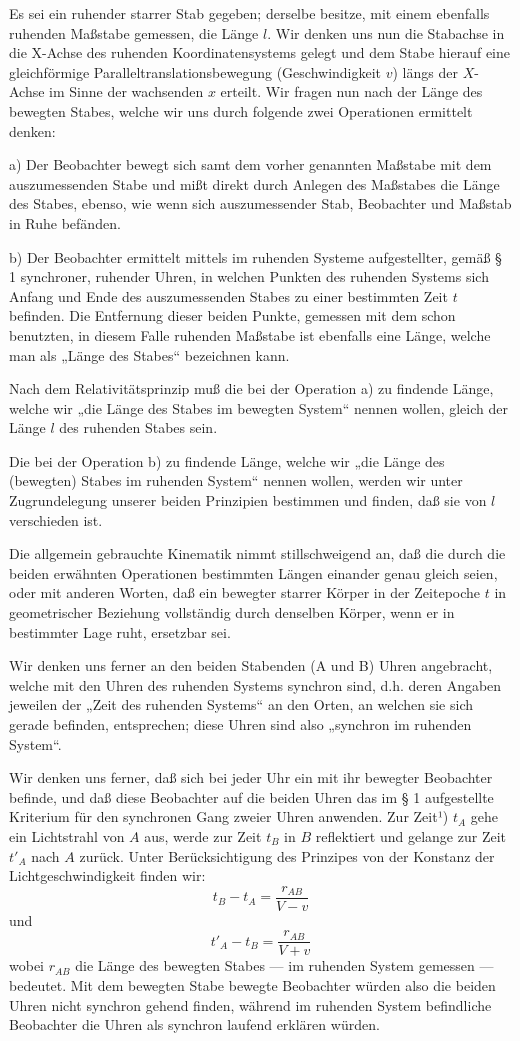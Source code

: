 \documentclass[17pt]{webarticle}       %
\begin{document}
Es sei ein ruhender starrer Stab gegeben; derselbe besitze, mit einem ebenfalls ruhenden Maßstabe gemessen, die Länge $l$. Wir denken uns nun die Stabachse in die X-Achse des ruhenden Koordinatensystems gelegt und dem Stabe hierauf eine gleichförmige Paralleltranslationsbewegung (Geschwindigkeit $v$) längs der $X$-Achse im Sinne der wachsenden $x$ erteilt. Wir fragen nun nach der Länge des bewegten Stabes, welche wir uns durch folgende zwei Operationen ermittelt denken:

a) Der Beobachter bewegt sich samt dem vorher genannten Maßstabe mit dem auszumessenden Stabe und mißt direkt durch Anlegen des Maßstabes die Länge des Stabes, ebenso, wie wenn sich auszumessender Stab, Beobachter und Maßstab in Ruhe befänden.

b) Der Beobachter ermittelt mittels im ruhenden Systeme aufgestellter, gemäß § 1 synchroner, ruhender Uhren, in welchen Punkten des ruhenden Systems sich Anfang und Ende des auszumessenden Stabes zu einer bestimmten Zeit $t$ befinden. Die Entfernung dieser beiden Punkte, gemessen mit dem schon benutzten, in diesem Falle ruhenden Maßstabe ist ebenfalls eine Länge, welche man als „Länge des Stabes“ bezeichnen kann.

Nach dem Relativitätsprinzip muß die bei der Operation a) zu findende Länge, welche wir „die Länge des Stabes im bewegten System“ nennen wollen, gleich der Länge \( l \) des ruhenden Stabes sein.

Die bei der Operation b) zu findende Länge, welche wir „die Länge des (bewegten) Stabes im ruhenden System“ nennen wollen, werden wir unter Zugrundelegung unserer beiden Prinzipien bestimmen und finden, daß sie von \( l \) verschieden ist.

Die allgemein gebrauchte Kinematik nimmt stillschweigend an, daß die durch die beiden erwähnten Operationen bestimmten Längen einander genau gleich seien, oder mit anderen Worten, daß ein bewegter starrer Körper in der Zeitepoche \( t \) in geometrischer Beziehung vollständig durch denselben Körper, wenn er in bestimmter Lage ruht, ersetzbar sei.

Wir denken uns ferner an den beiden Stabenden (A und B) Uhren angebracht, welche mit den Uhren des ruhenden Systems synchron sind, d.h. deren Angaben jeweilen der „Zeit des ruhenden Systems“ an den Orten, an welchen sie sich gerade befinden, entsprechen; diese Uhren sind also „synchron im ruhenden System“.

Wir denken uns ferner, daß sich bei jeder Uhr ein mit ihr bewegter Beobachter befinde, und daß diese Beobachter auf die beiden Uhren das im § 1 aufgestellte Kriterium für den synchronen Gang zweier Uhren anwenden. Zur Zeit¹) $t_A$ gehe ein Lichtstrahl von \( A \) aus, werde zur Zeit $t_B$ in \( B \) reflektiert und gelange zur Zeit \( t'_A \) nach \( A \) zurück. Unter Berücksichtigung des Prinzipes von der Konstanz der Lichtgeschwindigkeit finden wir:
\[
t_B - t_A = \frac{r_{AB}}{V - v}
\]
und
\[
t'_A - t_B = \frac{r_{AB}}{V + v}
\]
wobei $r_{AB}$ die Länge des bewegten Stabes — im ruhenden System gemessen — bedeutet. Mit dem bewegten Stabe bewegte Beobachter würden also die beiden Uhren nicht synchron gehend finden, während im ruhenden System befindliche Beobachter die Uhren als synchron laufend erklären würden.
\end{document}
